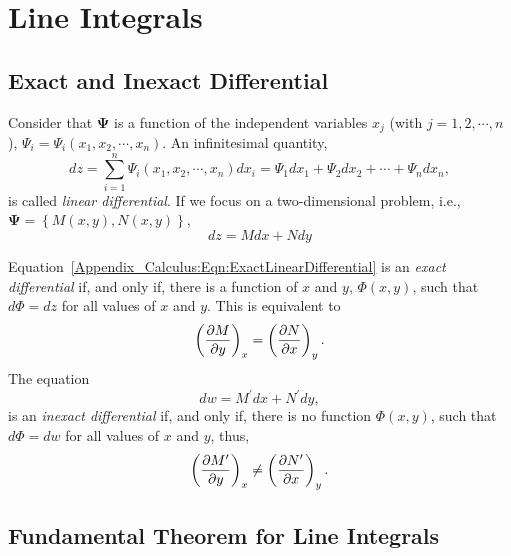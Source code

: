 \section{Line Integrals}

\subsection{Exact and Inexact Differential}
Consider that $\mathbf{\Psi}$ is a function of the independent variables $x_{j}$ (with $j=1,2,\cdots,n$),  $\Psi_{i}=\Psi_{i}\left(x_{1},x_{2},\cdots,x_{n}\right)$. An infinitesimal quantity,
   \begin{displaymath}
      dz = \sum\limits_{i=1}^{n} \Psi_{i}\left(x_{1},x_{2},\cdots,x_{n}\right) d x_{i} =  \Psi_{1} d x_{1} + \Psi_{2} d x_{2} +\cdots + \Psi_{n} d x_{n},
   \end{displaymath}
is called {\it linear differential}. If we focus on a two-dimensional problem, i.e., $\mathbf{\Psi}=\left\{M(x,y),N(x,y)\right\}$,
   \begin{equation}
      dz = M d x + N d y\label{Appendix_Calculus:Eqn:ExactLinearDifferential}
   \end{equation}

\medskip
Equation~\ref{Appendix_Calculus:Eqn:ExactLinearDifferential} is an {\it exact differential} if, and only if, there is a function of $x$ and $y$, $\Phi(x,y)$, such that $d \Phi= d z$ for all values of $x$ and $y$. This is equivalent to
   \begin{displaymath}
        \Partial[M]{y}{x} = \Partial[N]{x}{y}.
   \end{displaymath}
The equation
   \begin{equation}
      dw = M^{\prime} d x + N^{\prime} d y,\label{Appendix_Calculus:Eqn:InexactLinearDifferential}
   \end{equation}
 is an {\it inexact differential} if, and only if, there is no function $\Phi(x,y)$, such that $d \Phi = d w$ for all values of $x$ and $y$, thus,
   \begin{displaymath}
        \Partial[M^{\prime}]{y}{x} \neq \Partial[N^{\prime}]{x}{y}.
   \end{displaymath}

\subsection{Fundamental Theorem for Line Integrals}

